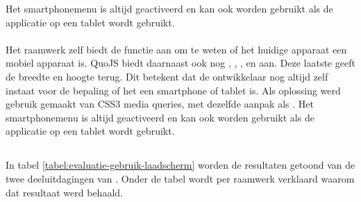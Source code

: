 Het smartphonemenu is altijd geactiveerd en kan ook worden gebruikt als de applicatie op een tablet wordt gebruikt.

\paragraph{\lungo}
Het raamwerk zelf biedt de functie  aan om te weten of het huidige apparaat een mobiel apparaat is.
QuoJS biedt daarnaast ook nog , , ,  en  aan.
Deze laatste geeft de breedte en hoogte terug.
Dit betekent dat de ontwikkelaar nog altijd zelf instaat voor de bepaling of het een smartphone of tablet is.
Als oplossing werd gebruik gemaakt van CSS3 media queries, met dezelfde aanpak als \jqm{}.
Het smartphonemenu is altijd geactiveerd en kan ook worden gebruikt als de applicatie op een tablet wordt gebruikt.


\subsection{} 
\label{sec:evaluatie-gebruik-laadscherm}

In tabel \ref{tabel:evaluatie-gebruik-laadscherm} worden de resultaten getoond van de twee deeluitdagingen van .
Onder de tabel wordt per raamwerk verklaard waarom dat resultaat werd behaald.

\begin{table}[H]
\centering
{}
\caption{Gebruik van  voor \st{}~(\sta), \kendo{}~(\kendoa), \jqm{}~(\jqma) en \lungo{}~(\lungoa).}
\label{tabel:evaluatie-gebruik-laadscherm}
\end{table}

